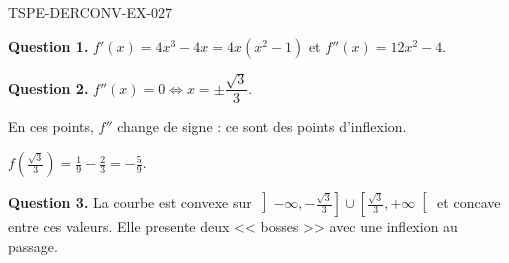 \begin{corrige}{TSPE-DERCONV-EX-027}

\textbf{Question 1.} $f'(x) = 4x^3 - 4x = 4x(x^2-1)$ et $f''(x) = 12x^2 - 4$.


\textbf{Question 2.} $f''(x) = 0 \iff x = \pm\dfrac{\sqrt{3}}{3}$.

En ces points, $f''$ change de signe : ce sont des points d'inflexion.

$\displaystyle f\!\left(\frac{\sqrt{3}}{3}\right) = \frac{1}{9} - \frac{2}{3} = -\frac{5}{9}$.

\textbf{Question 3.} La courbe est convexe sur $\left]-\infty, -\frac{\sqrt3}{3}\right] \cup \left[\frac{\sqrt3}{3}, +\infty\right[$ et concave entre ces valeurs. Elle presente deux << bosses >> avec une inflexion au passage.

\end{corrige}
